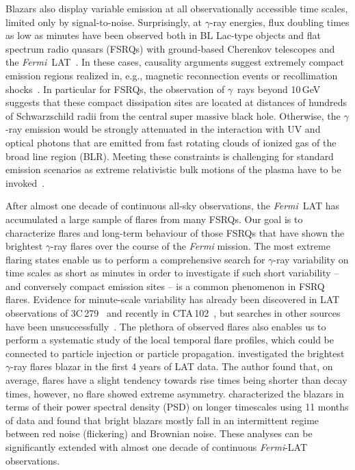 \documentclass[twocolumn,linenumbers]{aastex62}
\newcommand{\Grays}{$\gamma$~rays\xspace}
\newcommand{\gray}{$\gamma$-ray\xspace}
\newcommand{\Fermi}{\emph{Fermi}\xspace}
\newcommand{\FermiLAT}{\emph{Fermi}~LAT\xspace}
\newcommand{\fermiLAT}{\emph{Fermi}-LAT\xspace}
\begin{document}
Blazars also display variable emission at all observationally accessible time scales, limited only by signal-to-noise.
Surprisingly, at \gray energies, flux doubling times as low as minutes have been observed both in BL Lac-type objects and flat spectrum radio quasars (FSRQs) with ground-based Cherenkov telescopes and the \FermiLAT~\cite[e.g.][]{pks2155hess2007,pks1222magic2011,TheFermi-LAT:2016dss,2018ApJ...854L..26S}.
In these cases, causality arguments suggest extremely compact emission regions realized in, e.g., magnetic reconnection events or recollimation shocks~\cite[e.g.][]{Petropoulou:2016xat,Bodo:2017qqn}.
In particular for FSRQs, the observation of \Grays beyond 10\,GeV suggests that these compact dissipation sites are located at distances of hundreds of Schwarzschild  radii from the central super massive black hole. 
Otherwise, the \gray emission would be strongly attenuated in the interaction with UV and optical photons that are emitted from fast rotating clouds of ionized gas of the broad line region (BLR). 
Meeting these constraints is challenging for standard emission scenarios as extreme relativistic bulk motions of the plasma have to be invoked~\cite[e.g.,][]{TheFermi-LAT:2016dss}. 

After almost one decade of continuous all-sky observations, the \FermiLAT has accumulated a large sample of flares from many FSRQs.
Our goal is to characterize flares and long-term behaviour of those FSRQs that have shown the brightest \gray flares over the course of the \Fermi mission. 
The most extreme flaring states enable us to perform a comprehensive search for \gray variability on time scales as short as minutes in order to investigate if such short variability -- and conversely compact emission sites -- is a common phenomenon in FSRQ flares. 
Evidence for minute-scale variability has already been discovered in LAT observations of 3C\,279~\citep{TheFermi-LAT:2016dss} and recently in CTA\,102~\citep{2018ApJ...854L..26S}, but searches in other sources have been unsuccessfully~\citep{2017Galax...5..100N}.
The plethora of observed flares also enables us to perform a systematic study of the local temporal flare profiles, which could be connected to particle injection or particle propagation.
\citet{2013MNRAS.430.1324N} investigated the brightest \gray flares blazar in the first 4 years of LAT data.
The author found that, on average, flares have a slight tendency towards rise times being shorter than decay times, however, no flare showed extreme asymmetry. 
\citet{2010ApJ...722..520A} characterized the blazars in terms of their power spectral density (PSD) on longer timescales using 11 months of data and found that bright blazars mostly fall in an intermittent regime between red noise (flickering) and Brownian noise. 
These analyses can be significantly extended with almost one decade of continuous \fermiLAT observations.
\end{document}
